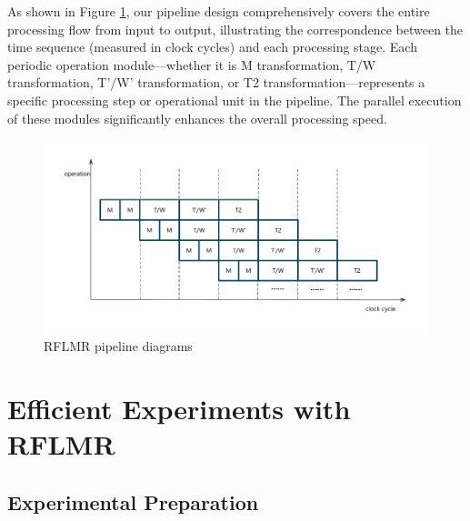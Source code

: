 \documentclass[electronics,article,accept,pdftex,moreauthors]{Definitions/mdpi}
\begin{document}
As shown in Figure \ref{fig5}, our pipeline design comprehensively covers the entire processing flow from input to output, illustrating the correspondence between the time sequence (measured in clock cycles) and each processing stage. Each periodic operation module—whether it is M transformation, T/W transformation, T’/W’ transformation, or T2 transformation—represents a specific processing step or operational unit in the pipeline. The parallel execution of these modules significantly enhances the overall processing speed.
\begin{figure}[H]
    \includegraphics[scale=0.6]{./images/5.pdf}
    \caption{RFLMR pipeline diagrams}
    \label{fig5}
\end{figure}
\section{Efficient Experiments with RFLMR}
\subsection{Experimental Preparation}
\end{document}
